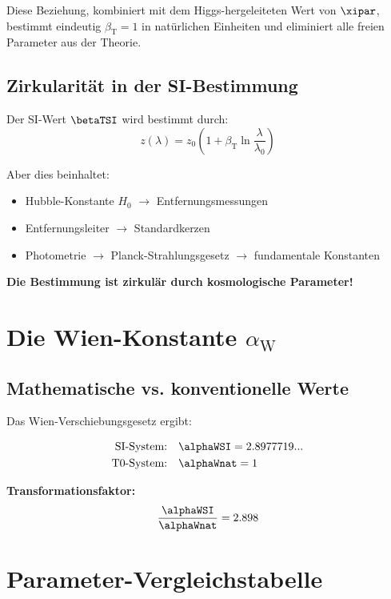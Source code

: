 	Diese Beziehung, kombiniert mit dem Higgs-hergeleiteten Wert von $\xipar$, bestimmt eindeutig $\beta_{\text{T}} = 1$ in natürlichen Einheiten und eliminiert alle freien Parameter aus der Theorie.
	
	\subsection{Zirkularität in der SI-Bestimmung}
	\label{subsec:beta_zirkularitaet}
	
	Der SI-Wert $\betaTSI$ wird bestimmt durch:
	$$z(\lambda) = z_0\left(1 + \beta_{\text{T}} \ln\frac{\lambda}{\lambda_0}\right)$$
	
	Aber dies beinhaltet:
	\begin{itemize}
		\item Hubble-Konstante $H_0$ $\rightarrow$ Entfernungsmessungen
		\item Entfernungsleiter $\rightarrow$ Standardkerzen
		\item Photometrie $\rightarrow$ Planck-Strahlungsgesetz $\rightarrow$ fundamentale Konstanten
	\end{itemize}
	
	\textbf{Die Bestimmung ist zirkulär durch kosmologische Parameter!}
	
	\section{Die Wien-Konstante $\alpha_{\text{W}}$}
	\label{sec:alpha_w}
	
	\subsection{Mathematische vs. konventionelle Werte}
	\label{subsec:wien_werte}
	
	Das Wien-Verschiebungsgesetz ergibt:
	
	\begin{align}
		\text{SI-System:} \quad &\alphaWSI = 2.8977719... \\
		\text{T0-System:} \quad &\alphaWnat = 1
	\end{align}
	
	\textbf{Transformationsfaktor:}
	$$\frac{\alphaWSI}{\alphaWnat} = 2.898$$
	
	\section{Parameter-Vergleichstabelle}
	\label{sec:parameter_vergleich}
	
